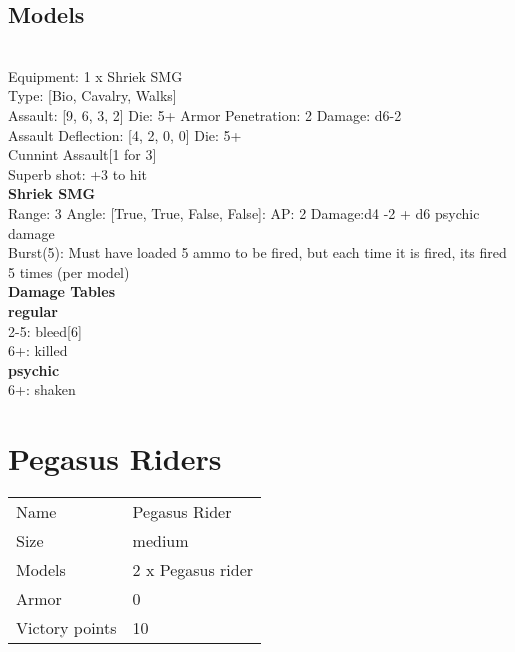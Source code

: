 \subsection{ Models }

 \\
Equipment: 1 x Shriek SMG \\
Type: [Bio, Cavalry, Walks] \\

Assault: [9, 6, 3, 2] Die: 5+ Armor Penetration: 2 Damage: d6-2 \\
Assault Deflection: [4, 2, 0, 0] Die: 5+\\
\indent Cunnint Assault[1 for 3]\\ 
 

Superb shot: +3 to hit\\ 


{\bf Shriek SMG } \\



Range: 3  Angle: [True, True, False, False]: AP: 2 Damage:d4 -2 + d6 psychic damage \\
Burst(5): Must have loaded 5 ammo to be fired, but each time it is fired, its fired 5 times (per model)\\ 




 





{\bf Damage Tables} \\
 {\bf regular } \\
2-5: bleed[6] \\
6+: killed \\
 {\bf psychic } \\
6+: shaken \\










\pagebreak\pagebreak

\section{ Pegasus Riders }

\begin{tabular}{ll}
  Name & Pegasus Rider \\
  Size & medium\\
  Models & 2 x Pegasus rider\\
  Armor & 0\\
  Victory points & 10\\
\end{tabular}

